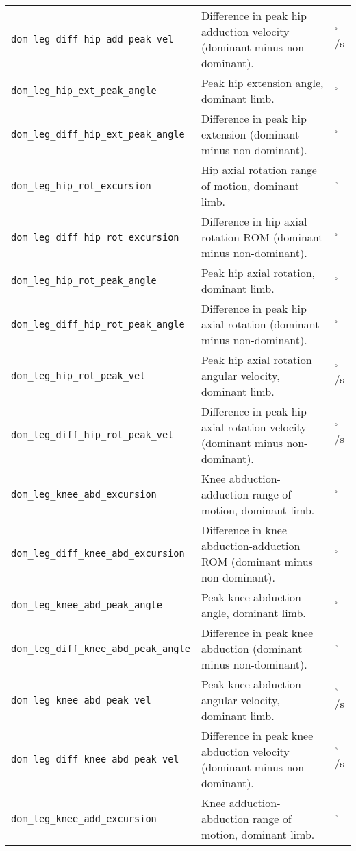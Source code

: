 \begin{longtable}{@{}l p{} l@{}}
    \texttt{dom\_leg\_diff\_hip\_add\_peak\_vel} & Difference in peak hip adduction velocity (dominant minus non-dominant). & $^\circ$/s \\
    \texttt{dom\_leg\_hip\_ext\_peak\_angle} & Peak hip extension angle, dominant limb. & $^\circ$ \\
    \texttt{dom\_leg\_diff\_hip\_ext\_peak\_angle} & Difference in peak hip extension (dominant minus non-dominant). & $^\circ$ \\
    \texttt{dom\_leg\_hip\_rot\_excursion} & Hip axial rotation range of motion, dominant limb. & $^\circ$ \\
    \texttt{dom\_leg\_diff\_hip\_rot\_excursion} & Difference in hip axial rotation ROM (dominant minus non-dominant). & $^\circ$ \\
    \texttt{dom\_leg\_hip\_rot\_peak\_angle} & Peak hip axial rotation, dominant limb. & $^\circ$ \\
    \texttt{dom\_leg\_diff\_hip\_rot\_peak\_angle} & Difference in peak hip axial rotation (dominant minus non-dominant). & $^\circ$ \\
    \texttt{dom\_leg\_hip\_rot\_peak\_vel} & Peak hip axial rotation angular velocity, dominant limb. & $^\circ$/s \\
    \texttt{dom\_leg\_diff\_hip\_rot\_peak\_vel} & Difference in peak hip axial rotation velocity (dominant minus non-dominant). & $^\circ$/s \\
    \texttt{dom\_leg\_knee\_abd\_excursion} & Knee abduction-adduction range of motion, dominant limb. & $^\circ$ \\
    \texttt{dom\_leg\_diff\_knee\_abd\_excursion} & Difference in knee abduction-adduction ROM (dominant minus non-dominant). & $^\circ$ \\
    \texttt{dom\_leg\_knee\_abd\_peak\_angle} & Peak knee abduction angle, dominant limb. & $^\circ$ \\
    \texttt{dom\_leg\_diff\_knee\_abd\_peak\_angle} & Difference in peak knee abduction (dominant minus non-dominant). & $^\circ$ \\
    \texttt{dom\_leg\_knee\_abd\_peak\_vel} & Peak knee abduction angular velocity, dominant limb. & $^\circ$/s \\
    \texttt{dom\_leg\_diff\_knee\_abd\_peak\_vel} & Difference in peak knee abduction velocity (dominant minus non-dominant). & $^\circ$/s \\
    \texttt{dom\_leg\_knee\_add\_excursion} & Knee adduction-abduction range of motion, dominant limb. & $^\circ$ \\

\end{longtable}
